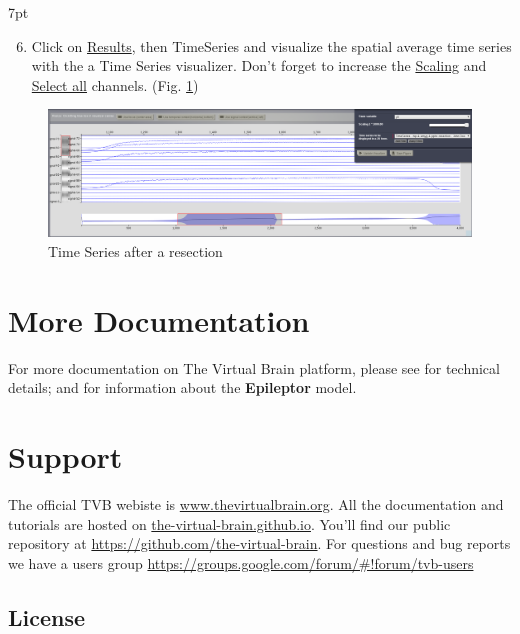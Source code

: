 \documentclass{tufte-handout}
\newenvironment{simulation}{%
  \def\FrameCommand{%
    \hspace{1pt}%
    {\color{ForestGreen}\vrule width 2pt}%
    {\color{simulationshade}\vrule width 4pt}%
    \colorbox{simulationshade}%
  }%
  \MakeFramed{\advance\hsize-\width\FrameRestore}%
  \noindent\hspace{-4.55pt}%
  \begin{adjustwidth}{}{7pt}%
  \vspace{2pt}\vspace{2pt}%
}
{%
  \vspace{2pt}\end{adjustwidth}\endMakeFramed%
}
\begin{document}
\begin{simulation}
  \begin{enumerate}
    \setcounter{enumi}{5}
  \item Click on \underline{Results}, then TimeSeries and visualize the spatial average time series with the a Time Series visualizer.
  Don't forget to increase the \underline{Scaling} and \underline{Select all} channels. (Fig. \ref{fig:ts_resec})
  \end{enumerate}
\end{simulation}

\begin{figure}[h]
  \includegraphics[width=\linewidth]{Handout_UI_ModellingAnEpilepticPatient_TimeSeriesResection}%
  \caption{Time Series after a resection}%
  \label{fig:ts_resec}%
\end{figure}


\section{More Documentation}\label{sec:more-doc}

For more documentation on The Virtual Brain platform, please see \citet{Sanz-
Leon_2013, Woodman_2014} for technical details; and \citet{Jirsa_2014} for
information about the \textbf{Epileptor} model.


\section{Support}\label{sec:support}

The official TVB webiste is \url{www.thevirtualbrain.org}.  
All the documentation and tutorials are hosted on \url{the-virtual-brain.github.io}.
You'll find our public  repository at \url{https://github.com/the-virtual-brain}. 
For questions and bug reports we have a users group \url{https://groups.google.com/forum/#!forum/tvb-users}

\subsection{License}
\end{document}
